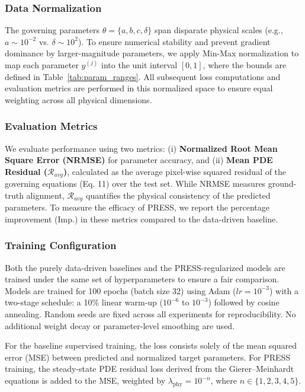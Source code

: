 \documentclass{article} %
\begin{document}
\subsubsection{Data Normalization}

The governing parameters $\theta = \{a, b, c, \delta\}$ span disparate physical scales (e.g., $a \sim 10^{-2}$ vs. $\delta \sim 10^2$). To ensure numerical stability and prevent gradient dominance by larger-magnitude parameters, we apply Min-Max normalization to map each parameter $y^{(j)}$ into the unit interval $[0, 1]$, where the bounds are defined in Table~\ref{tab:param_ranges}. All subsequent loss computations and evaluation metrics are performed in this normalized space to ensure equal weighting across all physical dimensions.

\subsubsection{Evaluation Metrics}
We evaluate performance using two metrics: (i) \textbf{Normalized Root Mean Square Error (NRMSE)} for parameter accuracy, and (ii) \textbf{Mean PDE Residual ($\mathcal{R}_{avg}$)}, calculated as the average pixel-wise squared residual of the governing equations (Eq. 11) over the test set. While NRMSE measures ground-truth alignment, $\mathcal{R}_{avg}$ quantifies the physical consistency of the predicted parameters. To measure the efficacy of PRESS, we report the percentage improvement ($\text{Imp.}$) in these metrics compared to the data-driven baseline.

\subsubsection{Training Configuration}

Both the purely data-driven baselines and the PRESS-regularized models are trained under the same set of hyperparameters to ensure a fair comparison. Models are trained for 100 epochs (batch size 32) using Adam ($lr=10^{-3}$) with a two-stage schedule: a 10\% linear warm-up ($10^{-6}$ to $10^{-3}$) followed by cosine annealing. Random seeds are fixed across all experiments for reproducibility. No additional weight decay or parameter-level smoothing are used.

For the baseline supervised training, the loss consists solely of the mean squared error (MSE) between predicted and normalized target parameters. For PRESS training, the steady-state PDE residual loss derived from the Gierer–Meinhardt equations is added to the MSE, weighted by $\lambda_{\text{phy}} = 10^{-n}$, where $n \in \{1, 2, 3, 4, 5\}$.
\end{document}

